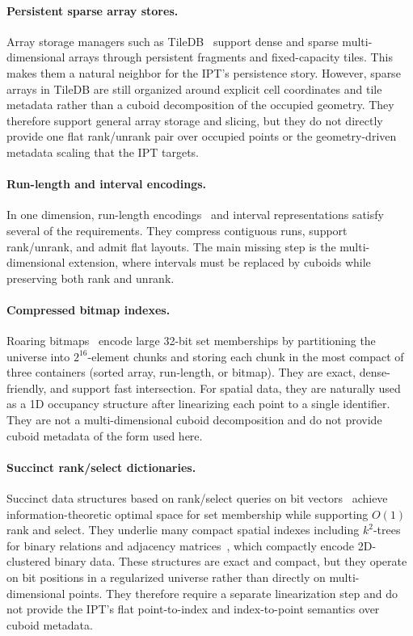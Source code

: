 \documentclass[manuscript,screen,review]{acmart}
\theoremstyle{definition}
\theoremstyle{plain}
\begin{document}
\paragraph{Persistent sparse array stores.}
Array storage managers such as
TileDB~\cite{PapadopoulosDattaMaddenMattson2016} support dense and
sparse multi-dimensional arrays through persistent fragments and
fixed-capacity tiles. This makes them a natural neighbor for the
IPT's persistence story. However, sparse arrays in TileDB are still
organized around explicit cell coordinates and tile metadata rather
than a cuboid decomposition of the occupied geometry. They therefore
support general array storage and slicing, but they do not directly
provide one flat rank/unrank pair over occupied points or the
geometry-driven metadata scaling that the IPT targets.

\paragraph{Run-length and interval encodings.}
In one dimension, run-length encodings~\cite{Golomb1966} and interval
representations satisfy several of the requirements. They compress
contiguous runs, support rank/unrank, and admit flat layouts. The main
missing step is the multi-dimensional extension, where intervals must
be replaced by cuboids while preserving both rank and unrank.

\paragraph{Compressed bitmap indexes.}
Roaring bitmaps~\cite{ChambiLemireKaserGodin2016,LemireBoyttsovKurz2018}
encode large 32-bit set memberships by partitioning the universe into
$2^{16}$-element chunks and storing each chunk in the most compact of
three containers (sorted array, run-length, or bitmap). They are exact,
dense-friendly, and support fast intersection. For spatial data, they
are naturally used as a 1D occupancy structure after linearizing each
point to a single identifier. They are not a multi-dimensional cuboid
decomposition and do not provide cuboid metadata of the form used here.

\paragraph{Succinct rank/select dictionaries.}
Succinct data structures based on rank/select queries on bit
vectors~\cite{Jacobson1989,RamanRamanRao2007} achieve
information-theoretic optimal space for set membership while
supporting $O(1)$ rank and select. They underlie many compact spatial
indexes including $k^2$-trees for binary relations and adjacency
matrices~\cite{BrisaboaLadraNavarro2014}, which compactly encode
2D-clustered binary data. These structures are exact and compact, but
they operate on bit positions in a regularized universe rather than
directly on multi-dimensional points. They therefore require a
separate linearization step and do not provide the IPT's flat
point-to-index and index-to-point semantics over cuboid metadata.
\end{document}
